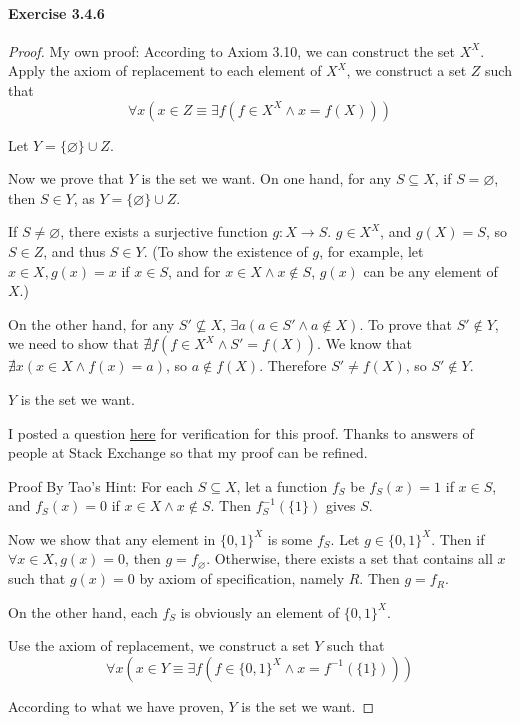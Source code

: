 \paragraph{Exercise 3.4.6} \label{exercise3.4.6}
\begin{proof}
My own proof: According to Axiom 3.10, we can construct the set $X^X$. Apply the axiom 
of replacement to each element of $X^X$, we construct a set $Z$ such that
\[
\forall x(x \in Z \equiv \exists f(f \in X^X \wedge x = f(X)))
\]

Let $Y = \{\varnothing\} \cup Z$.

Now we prove that $Y$ is the set we want. On one hand, for any $S \subseteq X$, 
if $S = \varnothing$, then $S \in Y$, as $Y = \{\varnothing\} \cup Z$.

If $S \neq \varnothing$, there exists a surjective function $g: X \rightarrow S$. $g\in X^X$, and 
$g(X) = S$, so $S \in Z$, and thus $S \in Y$. (To show the existence of $g$, for example, let $x \in X, 
g(x) = x$ if $x \in S$, and for $x \in X \wedge x \notin S$, $g(x)$ can be any element of $X$.)


On the other hand, for any $S' \nsubseteq X$, $\exists a(a \in S' \wedge a \notin X)$. To prove that 
$S' \notin Y$, we need to show that $\nexists f(f \in X^X \wedge S' = f(X))$. We know that 
$\nexists x(x \in X \wedge f(x) = a)$, so $a \notin f(X)$. Therefore $S' \neq f(X)$, so $S' \notin Y$.

$Y$ is the set we want.

I posted a question \href{https://math.stackexchange.com/questions/3803487/is-this-proof-to-the-existence-of-a-set-that-contains-all-subsets-of-another-set}{here} for verification for this proof. 
Thanks to answers of people at Stack Exchange so that my proof can be refined.

Proof By Tao's Hint:
For each $S \subseteq X$, let a function $f_S$ be $f_S(x) = 1$ if $x \in S$, and $f_S(x)=0$ if 
$x \in X \wedge x \notin S$. Then $f^{-1}_S(\{1\})$ gives $S$. 

Now we show that any element in 
$\{0,1\}^X$ is some $f_S$. Let $g \in \{0,1\}^X$. Then if $\forall x \in X, g(x) = 0$, then 
$g = f_{\varnothing}$. Otherwise, there exists a set that contains all $x$ such that $g(x) = 0$ by 
axiom of specification, namely $R$. Then $g = f_R$.

On the other hand, each $f_S$ is obviously an element of $\{0,1\}^X$.

Use the axiom of replacement, we construct a set $Y$ such that
\[
\forall x (x \in Y \equiv \exists f(f \in \{0,1\}^X \wedge x = f^{-1}(\{1\})))
\]

According to what we have proven, $Y$ is the set we want.
\end{proof}

